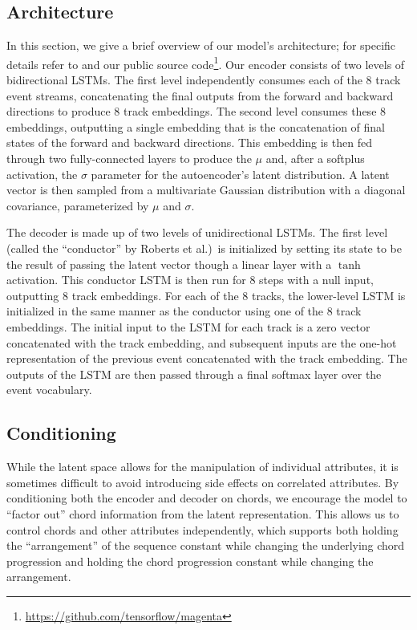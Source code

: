 \documentclass{article}
\begin{document}
\subsection{Architecture}
In this section, we give a brief overview of our model's architecture; for specific details refer to \cite{roberts2018hierarchical} and our public source code\footnote{\url{https://github.com/tensorflow/magenta}}.  Our encoder consists of two levels of bidirectional LSTMs.  The first level independently consumes each of the 8 track event streams, concatenating the final outputs from the forward and backward directions to produce 8 track embeddings.  The second level consumes these 8 embeddings, outputting a single embedding that is the concatenation of final states of the forward and backward directions.  This embedding is then fed through two fully-connected layers to produce the $\mu$ and, after a softplus activation, the $\sigma$ parameter for the autoencoder's latent distribution.  A latent vector is then sampled from a multivariate Gaussian distribution with a diagonal covariance, parameterized by $\mu$ and $\sigma$.

The decoder is made up of two levels of unidirectional LSTMs.  The first level (called the ``conductor'' by Roberts et al.)\ is initialized by setting its state to be the result of passing the latent vector though a linear layer with a $\tanh$ activation. This conductor LSTM is then run for 8 steps with a null input, outputting 8 track embeddings.  For each of the 8 tracks, the lower-level LSTM is initialized in the same manner as the conductor using one of the 8 track embeddings. The initial input to the LSTM for each track is a zero vector concatenated with the track embedding, and subsequent inputs are the one-hot representation of the previous event concatenated with the track embedding.  The outputs of the LSTM are then passed through a final softmax layer over the event vocabulary.

\subsection{Conditioning}
\label{subsec:conditioning}

While the latent space allows for the manipulation of individual attributes, it is sometimes difficult to avoid introducing side effects on correlated attributes. By conditioning both the encoder and decoder on chords, we encourage the model to ``factor out'' chord information from the latent representation.  This allows us to control chords and other attributes independently, which supports both holding the ``arrangement'' of the sequence constant while changing the underlying chord progression and holding the chord progression constant while changing the arrangement.
\end{document}
